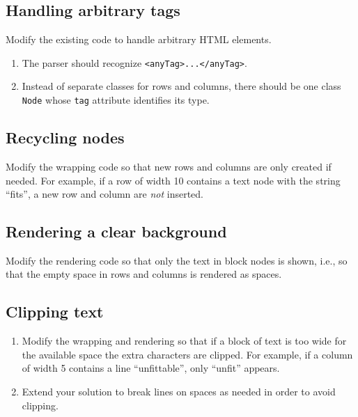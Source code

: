 \documentclass[krantzl]{krantz}
\begin{document}
\subsection*{Handling arbitrary tags}


Modify the existing code to handle arbitrary HTML elements.

\begin{enumerate}

\item 

The parser should recognize \texttt{<anyTag>...</anyTag>}.



\item 

Instead of separate classes for rows and columns,
    there should be one class \texttt{Node} whose \texttt{tag} attribute identifies its type.



\end{enumerate}

\subsection*{Recycling nodes}


Modify the wrapping code so that new rows and columns are only created if needed.
For example,
if a row of width 10 contains a text node with the string “fits”,
a new row and column are \emph{not} inserted.

\subsection*{Rendering a clear background}


Modify the rendering code so that only the text in block nodes is shown,
i.e.,
so that the empty space in rows and columns is rendered as spaces.

\subsection*{Clipping text}

\begin{enumerate}

\item 

Modify the wrapping and rendering so that
    if a block of text is too wide for the available space
    the extra characters are clipped.
    For example,
    if a column of width 5 contains a line “unfittable”,
    only “unfit” appears.



\item 

Extend your solution to break lines on spaces as needed
    in order to avoid clipping.



\end{enumerate}
\end{document}
